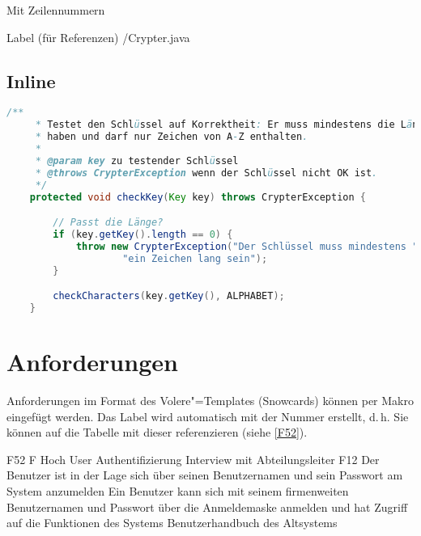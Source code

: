 Mit Zeilennummern

 Label (für Referenzen)
                 {\srcloc/Crypter.java}       %


\subsection{Inline}

\begin{lstlisting}[language=Java,caption=Methode checkKey()]
    /**
     * Testet den Schlüssel auf Korrektheit: Er muss mindestens die Länge 1
     * haben und darf nur Zeichen von A-Z enthalten.
     *
     * @param key zu testender Schlüssel
     * @throws CrypterException wenn der Schlüssel nicht OK ist.
     */
    protected void checkKey(Key key) throws CrypterException {

        // Passt die Länge?
        if (key.getKey().length == 0) {
            throw new CrypterException("Der Schlüssel muss mindestens " +
                    "ein Zeichen lang sein");
        }

        checkCharacters(key.getKey(), ALPHABET);
    }
\end{lstlisting}


\section{Anforderungen}

Anforderungen im Format des Volere"=Templates (Snowcards) \autocite{Volere} können per Makro eingefügt werden. Das Label wird automatisch mit der Nummer erstellt, d.\,h. Sie können auf die Tabelle mit dieser referenzieren (siehe \autoref{F52}).

\snowcard %
   {F52} %
   {F} %
   {Hoch} %
   {User Authentifizierung} %
   {Interview mit Abteilungsleiter} %
   {F12} %
   {Der Benutzer ist in der Lage sich über seinen
    Benutzernamen und sein Passwort am System anzumelden} %
   {Ein Benutzer kann sich mit seinem firmenweiten Benutzernamen und
   Passwort über die Anmeldemaske anmelden und hat Zugriff auf die
   Funktionen des Systems} %
   {Benutzerhandbuch des Altsystems} %

